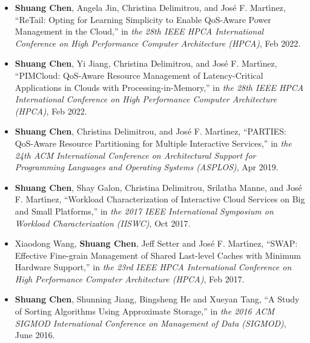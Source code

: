 \documentclass{res}
\begin{document}
\begin{resume}
\begin{itemize}[leftmargin=*]

\item {\bf Shuang Chen}, Angela Jin, Christina Delimitrou, and Jos{\'e} F. Mart{\'\i}nez, ``ReTail: Opting for Learning Simplicity to Enable QoS-Aware Power Management in the Cloud,'' in {\em the 28th IEEE HPCA International Conference on High Performance Computer Architecture (HPCA)}, Feb 2022.

\item {\bf Shuang Chen}, Yi Jiang, Christina Delimitrou, and Jos{\'e} F. Mart{\'\i}nez, ``PIMCloud: QoS-Aware Resource Management of Latency-Critical Applications in Clouds with Processing-in-Memory,'' in {\em the 28th IEEE HPCA International Conference on High Performance Computer Architecture (HPCA)}, Feb 2022.

\item {\bf Shuang Chen}, Christina Delimitrou, and Jos{\'e} F. Mart{\'\i}nez, ``PARTIES: QoS-Aware Resource Partitioning for Multiple Interactive Services,'' in {\em the 24th ACM International Conference on Architectural Support for Programming Languages and Operating Systems (ASPLOS)}, Apr 2019.

\item {\bf Shuang Chen}, Shay Galon, Christina Delimitrou, Srilatha Manne, and Jos{\'e} F. Mart{\'\i}nez, ``Workload Characterization of Interactive Cloud Services on Big and Small Platforms,'' in {\em the 2017 IEEE International Symposium on Workload Characterization (IISWC)}, Oct 2017.

\item Xiaodong Wang, {\bf Shuang Chen}, Jeff Setter and Jos{\'e} F. Mart{\'\i}nez, ``SWAP: Effective Fine-grain Management of Shared Last-level Caches with Minimum Hardware Support,'' in {\em the 23rd IEEE HPCA International Conference on High Performance Computer Architecture (HPCA)}, Feb 2017.

\item  {\bf Shuang Chen}, Shunning Jiang, Bingsheng He and Xueyan Tang, ``A Study of Sorting Algorithms Using Approximate Storage,'' in {\em the 2016 ACM SIGMOD International Conference on Management of Data (SIGMOD)}, June 2016.


\end{itemize}
\end{resume}
\end{document}
